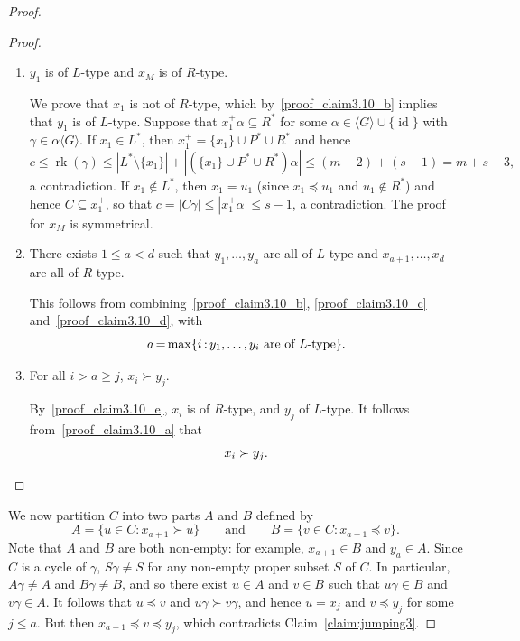 \documentclass[ALCO,ThmDefs,Unicode,epreuves]{cedram}
\DeclareMathOperator{\rk}{rk}
\DeclareMathOperator{\id}{id}
\newcommand{\genset}[1]{\langle#1\rangle}
\newcommand{\set}[2]{\{#1:#2\}}
\newcommand*{\Mk}{\mkern -2mu}
\begin{document}
\begin{proof}
\begin{proof}
\begin{enumerate}[(\alph*)]
\item\label{proof_claim3.10_d}
$y_1$ is of $L$-type and $x_M$ is of $R$-type.

 We prove that $x_1$ is not of $R$-type, which by~\ref{proof_claim3.10_b} implies that $y_1$ is of $L$-type. Suppose that $x_1^+ \alpha \subseteq R^*$ for some
 $\alpha\in\genset{G}\cup\{\id\}$ with $\gamma\in\alpha\genset{G}$. If $x_1 \in
 L^*$, then $x_1^+ = \{x_1\} \cup P^* \cup R^*$ and hence 
 \[ 
 c \le \rk(\gamma)
 \le |L^* \setminus \{x_1\}| + |(\{x_1\} \cup P^* \cup R^*)\alpha| \le (m-2) +
 (s-1) = m + s - 3 ,
 \]
  a contradiction. If $x_1 \notin L^*$, then $x_1 = u_1$
 (since $x_1 \preceq u_1$ and $u_1 \not\in R^*$) and hence $C \subseteq x_1^+$, so
 that $c=|C\gamma| \le |x_1^+ \alpha| \le s-1$, a contradiction. The proof for $x_M$ is
 symmetrical.

 \item\label{proof_claim3.10_e} 
 There exists $1 \le a < d$ such that $y_1, \dots, y_a$ are all of
 $L$-type and $x_{a+1}, \dots, x_d$ are all of $R$-type.

 This follows from combining~\ref{proof_claim3.10_b}, \ref{proof_claim3.10_c} and~\ref{proof_claim3.10_d}, with 
 \[
 a\Mk =\Mk \max\set{i\Mk }{\Mk y_1,\ldots,y_i \text{ are of $L$-type}}.
 \]

 \item\label{proof_claim3.10_f}  
 For all $i > a \ge j$, $x_i \succ y_j$.

 By~\ref{proof_claim3.10_e}, $x_i$ is of $R$-type, and $y_j$ of $L$-type. It follows from~\ref{proof_claim3.10_a} that 
 \[
 x_i \succ y_j.\qedhere
\]
\end{enumerate}
\end{proof}

We now partition $C$ into two parts $A$ and $B$ defined by
\[A = \{ u \in C : x_{a+1} \succ u \} \qquad\text{and}\qquad
B = \{ v \in C : x_{a+1} \preceq v \}.\]
Note that $A$ and $B$ are both non-empty: for example, $x_{a+1}\in B$ and $y_a\in A$.
Since $C$ is a cycle of $\gamma$, $S \gamma \ne S$ for any non-empty proper 
subset $S$ of $C$. In particular, $A \gamma \ne A$ and $B \gamma \ne B$, and so 
there exist $u\in A$ and $v\in B$ such that $u \gamma \in B$ and $v \gamma \in A$.
It follows that $u\preceq v$ and $u\gamma \succ v\gamma$, and hence
$u = x_j$ and $v \preceq y_j$ for some $j \le
a$. But then $x_{a+1}\preceq v\preceq y_j$, which
contradicts Claim~\ref{claim:jumping3}.
\end{proof}
\end{document}
